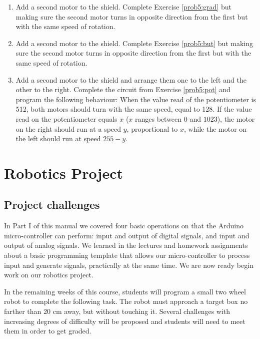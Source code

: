 \documentclass[12pt]{book}
\begin{document}
\begin{enumerate}[1.]
\item\label{ex6:ch5} Add a second motor to the shield. Complete Exercise
  \ref*{prob5:grad} but making sure the second motor turns in opposite
  direction from the first but with the same speed of rotation.

\item Add a second motor to the shield. Complete Exercise
  \ref*{prob5:but} but making sure the second motor turns in opposite
  direction from the first but with the same speed of rotation.

\item Add a second motor to the shield and arrange them one to the
  left and the other to the right. Complete the circuit from Exercise
  \ref*{prob5:pot} and program the following behaviour: When the value
  read of the potentiometer is 512, both motors should turn with the
  same speed, equal to 128. If the value read on the potentiometer
  equals $x$ ($x$ ranges between $0$ and $1023$), the motor on the
  right should run at a speed $y$, proportional to $x$, while the
  motor on the left should run at speed $255-y$.

\end{enumerate}



\part{Robotics Project}

\chapter{Project challenges}\label{challenge:chap}

In Part I of this manual we covered four basic operations on that the
Arduino micro-controller can perform: input and output of digital
signals, and input and output of analog signals. We learned in the
lectures and homework assignments about a basic programming template
that allows our micro-controller to process input and generate
signals, practically at the same time. We are now ready begin work
on our robotics project.

In the remaining weeks of this course, students will program a small
two wheel robot to complete the following task. The robot must approach a
target box no farther than 20 cm away, but without touching
it. Several challenges with increasing degrees of difficulty will be
proposed and students will need to meet them in order to get graded.
\end{document}
